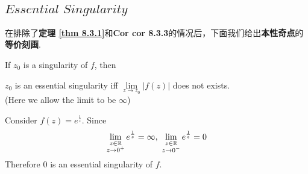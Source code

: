 \vspace{2em}
\subsection{$Essential \,\, Singularity$}
	在排除了\textbf{定理 \ref{thm 8.3.1}}和\textbf{Cor \textbf{cor 8.3.3}}的情况后，下面我们给出\textbf{本性奇点}的\textbf{等价刻画}.
	\begin{corollary}\label{cor 8.3.4}
		If $z_0$ is a singularity of $f$, then
		\begin{center}
			$z_0$ is an essential singularity \hspace*{1em} iff \hspace*{1em} $\underset{z \to z_0}{\lim}{\left| f(z) \right|}$ does not exists. \\
			(Here we allow the limit to be $\infty$)
		\end{center}
	\end{corollary}
	
	\begin{example}\label{ex 8.3.1}
		Consider $f(z) = e^{\frac{1}{z}}$. Since 
		\begin{align}
			\lim_{\substack{z \in \mathbb{R} \\ z \to 0^{+}}}{e^{\frac{1}{z}}} = \infty , \,\, \lim_{\substack{z \in \mathbb{R} \\ z \to 0^{-}}}{e^{\frac{1}{z}}} = 0
		\end{align}
		Therefore $0$ is an essential singularity of $f$.
	\end{example}

\newpage
